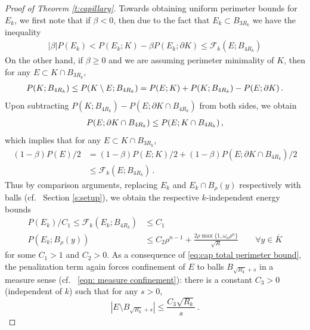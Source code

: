 \documentclass[10pt,reqno]{amsart}
\numberwithin{equation}{section}
\theoremstyle{definition}
\begin{document}
{{\begin{proof}[Proof of Theorem \ref{t:capillary}]
Towards obtaining uniform perimeter bounds for $E_k$, we first note that if $\beta<0$, then due to the fact that $E_k \subset B_{3R_k}$ we have the inequality
\begin{align}\label{eq:per bound when beta positive}
   |\beta|P(E_k) < P(E_k;K) - \beta P(E_k;\partial K) \leq \mathcal{F}_k(E;B_{4R_k}) 
\end{align}
On the other hand, if $\beta\geq 0$ and we are assuming perimeter minimality of $K$, then for any $E\subset K \cap B_{3R_k}$,
\begin{align}\notag
    P(K;B_{4R_k}) \leq P(K \setminus E;B_{4R_k})= P(E;K) + P(K;B_{4R_k}) - P(E;\partial K) \,.
\end{align}
Upon subtracting $P(K;B_{4R_k})-P(E;\partial K \cap B_{4R_k})$ from both sides, we obtain
\begin{align}\notag
    P(E;\partial K \cap B_{4R_k}) \leq P(E;K \cap B_{4R_k})\,,
\end{align}
which implies that for any $E\subset K \cap B_{3R_k}$,
\begin{align*}
(1-\beta)P(E)/2&= (1-\beta)P(E;K)/2+(1-\beta)P(E;\partial K \cap B_{4R_k})/2 \\
&\leq \mathcal{F}_k(E;B_{4R_k})  \,. 
\end{align*}
Thus by comparison arguments, replacing $E_k$ and $E_k \cap B_\rho(y)$ respectively with balls (cf.~ Section \ref{s:setup}), we obtain the respective $k$-independent energy bounds
\begin{align}\label{eq:cap total perimeter bound}
    P(E_k)/C_1 \leq \mathcal{F}_k(E_k;B_{4R_k}) &\leq C_1 \\ \label{eq:cap local perimeter bound}
    P(E_k;B_\rho(y)) &\leq C_2\rho^{n-1} + \frac{2\rho \max\{1,\omega_n \rho^n\}}{\sqrt{R}}\qquad \forall y\in \overline{K}
\end{align}
for some $C_1>1$ and $C_2>0$. As a consequence of \eqref{eq:cap total perimeter bound}, the penalization term again forces confinement of $E$ to balls $B_{\sqrt{R_k}+s}$ in a measure sense (cf.~ \eqref{eqn: measure confinement}): there is a constant $C_3>0$ (independent of $k$) such that for any $s>0$,
\begin{equation}\label{eq:cap measure confinement}
   |E \setminus B_{\sqrt{R_k}+s}|  \leq \frac{ C_3\sqrt{R_k}}{s}\,.  
\end{equation}


\medskip


\end{proof}}}
\end{document}
